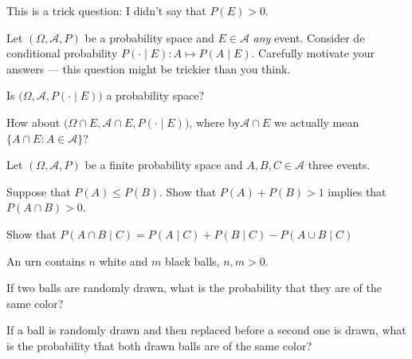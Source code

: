 \documentclass[a4paper,10pt,landscape,twocolumn]{scrartcl}
\begin{document}
\begin{exercise}[]
\begin{mycomment}
	This is a trick question: I didn't say that $P(E)>0$.
\end{mycomment}
Let $(\Omega, \mathcal{A}, P)$ be a probability space and $E\in \mathcal{A}$ \emph{any} event. Consider de conditional probability $P( \cdot \mid E): A \mapsto P(A\mid E)$. Carefully motivate your answers --- this question might be trickier than you think.
	\begin{subex}
		Is $\bigl(\Omega, \mathcal A, P(\cdot \mid E)\bigr)$ a probability space?	
	\end{subex}
	\begin{subex}
		How about $\bigl(\Omega\cap E, \mathcal A\cap E, P(\cdot \mid E)\bigr)$, where by$\mathcal A \cap E$ we actually mean $\{A\cap E: A\in \mathcal A\}$?
	\end{subex}
\end{exercise}

\begin{exercise}[]
Let $(\Omega, \mathcal{A}, P)$ be a finite probability space and $A, B, C\in \mathcal A$ three events.
	\begin{subex}
		Suppose that $P(A) \le P(B)$. Show that $P(A) + P(B) > 1$ implies that $P(A\cap B) > 0$.
	\end{subex}
	
	\begin{subex}
		Show that $P(A \cap B \mid C) = {P}(A\mid C) + {P}(B\mid C) - {P}(A \cup B \mid C)$ %
	\end{subex}
\end{exercise}

\begin{exercise}[]
	 An urn contains $n$ white and $m$ black balls, $n, m > 0$.
	
	\begin{subex}
		If two balls are randomly drawn, what is the probability that they are of the same color?		
	\end{subex}
	
	\begin{subex}
		If a ball is randomly drawn and then replaced before a second one is drawn, what is the probability that both drawn balls are of the same color?
	\end{subex}
		
\end{exercise}
\end{document}
